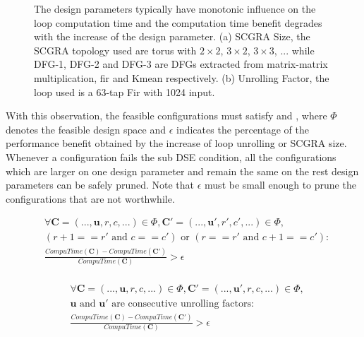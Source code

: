 \begin{figure}[tb]
    \centering
    \hfill
    \caption{The design parameters typically have monotonic influence on the
        loop computation time and the computation time benefit degrades with 
    the increase of the design parameter. (a) SCGRA Size, the SCGRA topology used are torus with $2
\times 2$, $3 \times 2$, $3 \times 3$, ... while DFG-1, DFG-2 and DFG-3 are DFGs extracted from
matrix-matrix multiplication, fir and Kmean respectively. (b) Unrolling Factor, the loop used is a
63-tap Fir with 1024 input.} 
    \label{fig:observation}
  \end{figure}

With this observation, the feasible configurations must satisfy  and , where $\Phi$ denotes the feasible design space and $\epsilon$ indicates the percentage of the performance benefit obtained by the increase of loop unrolling or SCGRA size. Whenever a configuration fails the sub DSE condition, all the configurations which are larger on one design parameter and remain the same on the rest design parameters can be safely pruned. Note that $\epsilon$ must be small enough to prune the configurations that are not worthwhile.

\begin{equation} \label{eq:cond1}
    \begin{split}
        &\forall \bm{C}=(...,\bm{u},r,c,...)\in \Phi, \bm{C'}=(...,\bm{u'},r',c',...) \in \Phi, \\
        & (r+1==r' \text{ and } c==c') \text{ or } (r==r' \text{ and } c+1==c'): \\ 
        &\frac{CompuTime(\bm{C})-CompuTime(\bm{C'})}{CompuTime(\bm{C})} > \epsilon \\
    \end{split}
\end{equation}

\begin{equation} \label{eq:cond2}
    \begin{split}
        &\forall \bm{C}=(...,\bm{u},r,c,...) \in \Phi, \bm{C'}=(...,\bm{u'},r,c,...) \in \Phi,\\ 
        &\bm{u} \text{ and } \bm{u'} \text{ are consecutive unrolling factors}: \\
        &\frac{CompuTime(\bm{C})-CompuTime(\bm{C'})}{CompuTime(\bm{C})} > \epsilon
    \end{split}
\end{equation}

